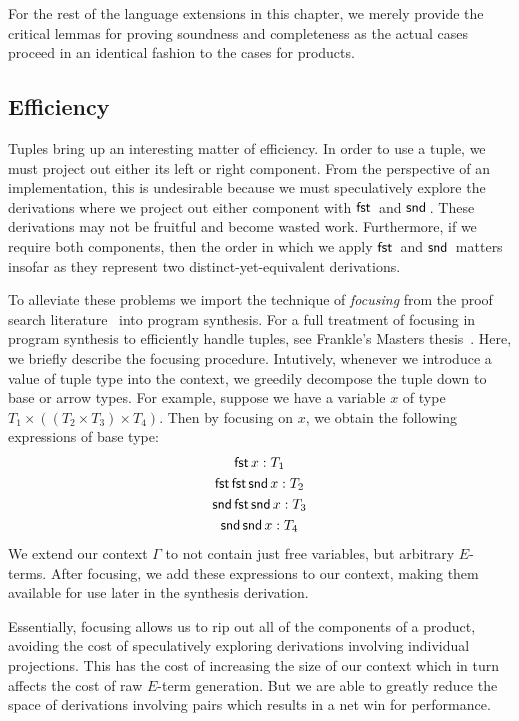 For the rest of the language extensions in this chapter, we merely provide the critical lemmas for proving soundness and completeness as the actual cases proceed in an identical fashion to the cases for products.

\subsection{Efficiency}
\label{subsec:tuple-efficiency}

Tuples bring up an interesting matter of efficiency.
In order to use a tuple, we must project out either its left or right component.
From the perspective of an implementation, this is undesirable because we must speculatively explore the derivations where we project out either component with $\mfst$ and $\msnd$.
These derivations may not be fruitful and become wasted work.
Furthermore, if we require both components, then the order in which we apply $\mfst$ and $\msnd$ matters insofar as they represent two distinct-yet-equivalent derivations.

To alleviate these problems we import the technique of \emph{focusing} from the proof search literature~ into program synthesis.  For a full treatment of focusing in program synthesis to efficiently handle tuples, see Frankle's Masters thesis~.
Here, we briefly describe the focusing procedure.
Intutively, whenever we introduce a value of tuple type into the context, we greedily decompose the tuple down to base or arrow types.
For example, suppose we have a variable $x$ of type $T_1 × ((T_2 × T_3) × T_4)$.
Then by focusing on $x$, we obtain the following expressions of base type:
\begin{gather*}
  \mathsf{fst}\,x : T_1 \\
  \mathsf{fst}\,\mathsf{fst}\,\mathsf{snd}\,x : T_2 \\
  \mathsf{snd}\,\mathsf{fst}\,\mathsf{snd}\,x : T_3 \\
  \mathsf{snd}\,\mathsf{snd}\,x : T_4
\end{gather*}
We extend our context $Γ$ to not contain just free variables, but arbitrary $E$-terms.
After focusing, we add these expressions to our context, making them available for use later in the synthesis derivation.

Essentially, focusing allows us to rip out all of the components of a product, avoiding the cost of speculatively exploring derivations involving individual projections.
This has the cost of increasing the size of our context which in turn affects the cost of raw $E$-term generation.
But we are able to greatly reduce the space of derivations involving pairs which results in a net win for performance.

